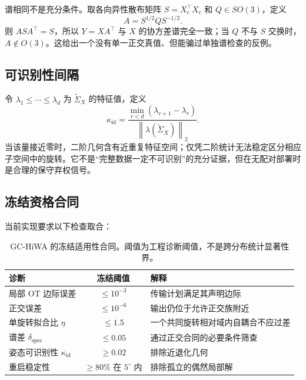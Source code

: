\documentclass[10pt,a4paper,fontset=windows]{ctexart}
\newcommand{\norm}[1]{\left\lVert #1\right\rVert}
\theoremstyle{definition}
\theoremstyle{remark}
\begin{document}
谱相同不是充分条件。取各向异性散布矩阵 $S=X_c^\top X_c$ 和 $Q\in SO(3)$，定义
\begin{equation}
A=S^{1/2}QS^{-1/2}.
\label{eq:isospectral-map}
\end{equation}
则 $ASA^\top=S$，所以 $Y=XA^\top$ 与 $X$ 的协方差谱完全一致；当 $Q$ 不与 $S$ 交换时，$A\notin O(3)$。这给出一个没有单一正交真值、但能骗过单独谱检查的反例。

\subsection{可识别性间隔}
令 $\lambda_1\le\cdots\le\lambda_d$ 为 $\widetilde\Sigma_X$ 的特征值，定义
\begin{equation}
\kappa_{\mathrm{id}}=
\frac{\min_{r<d}(\lambda_{r+1}-\lambda_r)}
{\norm{\lambda(\widetilde\Sigma_X)}_2}.
\label{eq:identifiability}
\end{equation}
当该量接近零时，二阶几何含有近重复特征空间；仅凭二阶统计无法稳定区分相应子空间中的旋转。它不是“完整数据一定不可识别”的充分证据，但在无配对部署时是合理的保守弃权信号。

\subsection{冻结资格合同}
当前实现要求以下检查取合：
\begin{table}[H]
\centering
\caption{GC-HiWA 的冻结适用性合同。阈值为工程诊断阈值，不是跨分布统计显著性界。}
\label{tab:qualification}
\begin{tabularx}{0.96\linewidth}{lCY}
\toprule
诊断 & 冻结阈值 & 解释\\
\midrule
局部 OT 边际误差 & $\le10^{-3}$ & 传输计划满足其声明边际\\
正交误差 & $\le10^{-6}$ & 输出仍位于允许正交族附近\\
单旋转拟合比 $\eta$ & $\le1.5$ & 一个共同旋转相对域内自耦合不应过差\\
谱差 $\delta_{\mathrm{spec}}$ & $\le0.05$ & 通过正交合同的必要条件筛查\\
姿态可识别性 $\kappa_{\mathrm{id}}$ & $\ge0.02$ & 排除近退化几何\\
重启稳定性 & $\ge80\%$ 在 $5^\circ$ 内 & 排除孤立的偶然局部解\\
\bottomrule
\end{tabularx}
\end{table}
\end{document}
